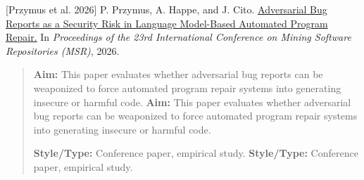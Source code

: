 \documentclass[11pt, a4paper]{article}
\begin{document}
\newpage
\noindent \hypertarget{p4}{[Przymus et al. 2026]} P. Przymus, A. Happe, and J. Cito. \href{https://arxiv.org/abs/2509.05372}{Adversarial Bug Reports as a Security Risk in Language Model-Based Automated Program Repair.} In \textit{Proceedings of the 23rd International Conference on Mining Software Repositories (MSR)}, 2026.
\begin{quote}
\textbf{Aim:} This paper evaluates whether adversarial bug reports can be weaponized to force automated program repair systems into generating insecure or harmful code.
\textbf{Aim:} This paper evaluates whether adversarial bug reports can be weaponized to force automated program repair systems into generating insecure or harmful code.

\vspace{0.5em}
\textbf{Style/Type:} Conference paper, empirical study.
\textbf{Style/Type:} Conference paper, empirical study.


\end{quote}
\end{document}
